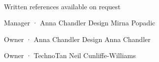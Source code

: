 \\
\begin{cvparagraph}
Written references available on request
\end{cvparagraph}


\begin{cventries}

  \cventry
    {Manager · Anna Chandler Design} %
    {Mirna Popadic} %
    {} %
    {}
    {
        \begin{cvitems}
        \end{cvitems}
    }

  \cventry
    {Owner · Anna Chandler Design} %
    {Anna Chandler} %
    {} %
    {}
    {
        \begin{cvitems}
        \end{cvitems}
    }

  \cventry
    {Owner · TechnoTan} %
    {Neil Cunliffe-Williams} %
    {} %
    {}
    {
        \begin{cvitems}
        \end{cvitems}
    }

\end{cventries}
